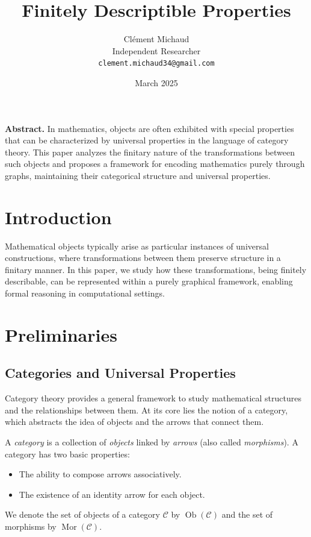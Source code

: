 \documentclass{article}
\title{Finitely Descriptible Properties}
\author{
Clément Michaud \\
Independent Researcher\\
\texttt{clement.michaud34@gmail.com}
}
\date{March 2025}
\begin{document}
\maketitle

\begin{center}
\begin{minipage}{0.9\textwidth}
\small
\textbf{Abstract.} In mathematics, objects are often exhibited with special properties that can be characterized by universal properties in the language of category theory. This paper analyzes the finitary nature of the transformations between such objects and proposes a framework for encoding mathematics purely through graphs, maintaining their categorical structure and universal properties.
\end{minipage}
\end{center}

\vspace{10pt}


\section{Introduction}

Mathematical objects typically arise as particular instances of universal constructions, where transformations between them preserve structure in a finitary manner. In this paper, we study how these transformations, being finitely describable, can be represented within a purely graphical framework, enabling formal reasoning in computational settings.

\section{Preliminaries}
\subsection{Categories and Universal Properties}

Category theory provides a general framework to study mathematical structures and the relationships between them. At its core lies the notion of a category, which abstracts the idea of objects and the arrows that connect them.


\begin{definition}[Category]
A \emph{category} is a collection of \emph{objects} linked by \emph{arrows} (also called \emph{morphisms}). A category has two basic properties:
\begin{itemize}
    \item The ability to compose arrows associatively.
    \item The existence of an identity arrow for each object.
\end{itemize}
We denote the set of objects of a category $\mathcal{C}$ by $\operatorname{Ob}(\mathcal{C})$ and the set of morphisms by $\operatorname{Mor}(\mathcal{C})$.
\end{definition}
\end{document}
